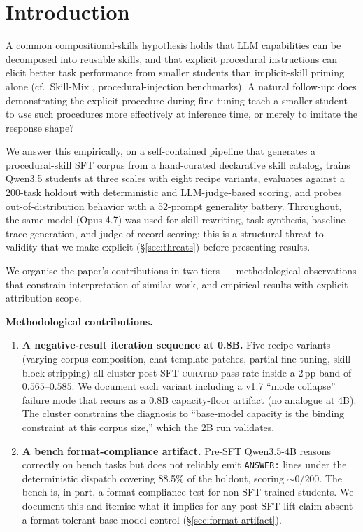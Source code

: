 \documentclass[10pt]{article}
\newcommand{\CU}{\textsc{curated}\xspace}
\newcommand{\Qwenf}{Qwen3.5-4B\xspace}
\begin{document}
\section{Introduction}

A common compositional-skills hypothesis holds that LLM capabilities can be decomposed into reusable skills, and that explicit procedural instructions can elicit better task performance from smaller students than implicit-skill priming alone (cf.\ Skill-Mix \citep{yu2024skillmix}, procedural-injection benchmarks). A natural follow-up: does demonstrating the explicit procedure during fine-tuning teach a smaller student to \emph{use} such procedures more effectively at inference time, or merely to imitate the response shape?

We answer this empirically, on a self-contained pipeline that generates a procedural-skill SFT corpus from a hand-curated declarative skill catalog, trains Qwen3.5 students at three scales with eight recipe variants, evaluates against a 200-task holdout with deterministic and LLM-judge-based scoring, and probes out-of-distribution behavior with a 52-prompt generality battery. Throughout, the same model (Opus 4.7) was used for skill rewriting, task synthesis, baseline trace generation, and judge-of-record scoring; this is a structural threat to validity that we make explicit (\S\ref{sec:threats}) before presenting results.

We organise the paper's contributions in two tiers --- methodological observations that constrain interpretation of similar work, and empirical results with explicit attribution scope.

\textbf{Methodological contributions.}
\begin{enumerate}[leftmargin=*]
  \item \textbf{A negative-result iteration sequence at 0.8B.} Five recipe variants (varying corpus composition, chat-template patches, partial fine-tuning, skill-block stripping) all cluster post-SFT \CU{} pass-rate inside a 2\,pp band of $0.565$--$0.585$. We document each variant including a v1.7 ``mode collapse'' failure mode that recurs as a 0.8B capacity-floor artifact (no analogue at 4B). The cluster constrains the diagnosis to ``base-model capacity is the binding constraint at this corpus size,'' which the 2B run validates.
  \item \textbf{A bench format-compliance artifact.} Pre-SFT \Qwenf{} reasons correctly on bench tasks but does not reliably emit \texttt{ANSWER:} lines under the deterministic dispatch covering 88.5\% of the holdout, scoring $\sim\!0/200$. The bench is, in part, a format-compliance test for non-SFT-trained students. We document this and itemise what it implies for any post-SFT lift claim absent a format-tolerant base-model control (\S\ref{sec:format-artifact}).
\end{enumerate}
\end{document}
